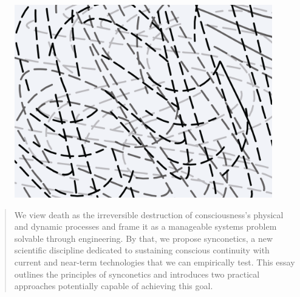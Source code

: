 \documentclass[10pt]{article}
\begin{document}
\begin{sloppypar}

  \begin{figure}[ht]
    \centering
    \includegraphics[width=\textwidth]{figures/cover.png}
    \label{fig:cover}
  \end{figure}
  \newpage



  \begin{abstract}
    We view death as the irreversible destruction of consciousness’s physical and dynamic processes and frame it as a manageable systems problem solvable through engineering. By that, we propose synconetics, a new scientific discipline dedicated to sustaining conscious continuity with current and near-term technologies that we can empirically test. This essay outlines the principles of synconetics and introduces two practical approaches potentially capable of achieving this goal.
  \end{abstract}

  \pagebreak
  \tableofcontents
  \pagebreak
  \listoffigures
  \pagebreak



\end{sloppypar}
\end{document}
